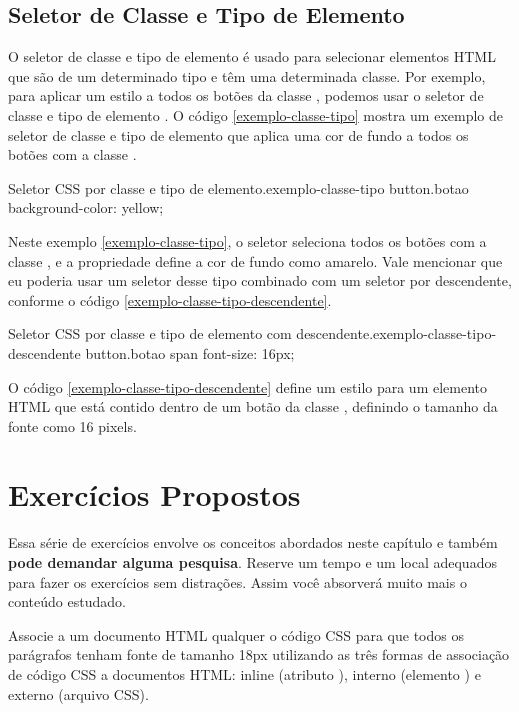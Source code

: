 \subsection{Seletor de Classe e Tipo de Elemento}

O seletor de classe e tipo de elemento é usado para selecionar elementos HTML que são de um determinado tipo e têm uma determinada classe. Por exemplo, para aplicar um estilo a todos os botões da classe , podemos usar o seletor de classe e tipo de elemento . O código \ref{exemplo-classe-tipo} mostra um exemplo de seletor de classe e tipo de elemento que aplica uma cor de fundo a todos os botões com a classe .

\begin{csscode}{Seletor CSS por classe e tipo de elemento.}{exemplo-classe-tipo}
button.botao {
    background-color: yellow;
}
\end{csscode}

Neste exemplo \ref{exemplo-classe-tipo}, o seletor  seleciona todos os botões com a classe , e a propriedade  define a cor de fundo como amarelo. Vale mencionar que eu poderia usar um seletor desse tipo combinado com um seletor por descendente, conforme o código \ref{exemplo-classe-tipo-descendente}.

\begin{csscode}{Seletor CSS por classe e tipo de elemento com descendente.}{exemplo-classe-tipo-descendente}
button.botao span {
    font-size: 16px;
}
\end{csscode}

O código \ref{exemplo-classe-tipo-descendente} define um estilo para um elemento HTML  que está contido dentro de um botão da classe , definindo o tamanho da fonte como 16 pixels.

\section{Exercícios Propostos}

Essa série de exercícios envolve os conceitos abordados neste capítulo e também \textbf{pode demandar alguma pesquisa}. Reserve um tempo e um local adequados para fazer os exercícios sem distrações. Assim você absorverá muito mais o conteúdo estudado.

\begin{exercise}
Associe a um documento HTML qualquer o código CSS para que todos os parágrafos tenham fonte de tamanho 18px utilizando as três formas de associação de código CSS a documentos HTML: inline (atributo ), interno (elemento ) e externo (arquivo CSS).
\end{exercise}


